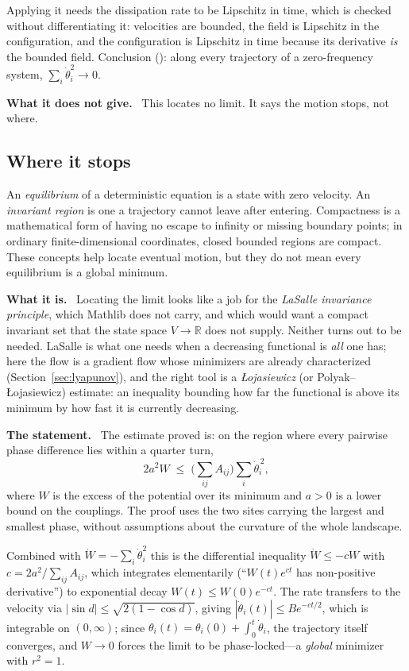 \documentclass[11pt]{article}
\newcommand{\what}{\par\smallskip\noindent\textbf{What it is.}\ }
\newcommand{\statement}{\par\smallskip\noindent\textbf{The statement.}\ }
\newcommand{\scope}{\par\smallskip\noindent\textbf{What it does not give.}\ }
\newcommand{\id}[1]{{\small\ttfamily\seqsplit{#1}}}
\newcommand{\R}{\mathbb{R}}
\begin{document}
Applying it needs the dissipation rate to be Lipschitz in time, which is
checked without differentiating it: velocities are bounded, the field is
Lipschitz in the configuration, and the configuration is Lipschitz in time
because its derivative \emph{is} the bounded field. Conclusion
(\id{velocity\_sq\_tendsto\_zero}): along every trajectory of a zero-frequency
system, $\sum_i\dot\theta_i^2\to0$.

\scope
This locates no limit. It says the motion stops, not where.

\subsection{Where it stops}

An \emph{equilibrium} of a deterministic equation is a state with zero
velocity. An \emph{invariant region} is one a trajectory cannot leave after
entering. Compactness is a mathematical form of having no escape to infinity
or missing boundary points; in ordinary finite-dimensional coordinates,
closed bounded regions are compact. These concepts help locate eventual motion,
but they do not mean every equilibrium is a global minimum.

\what
Locating the limit looks like a job for the \emph{LaSalle invariance
principle}, which Mathlib does not carry, and which would want a compact
invariant set that the state space $V\to\R$ does not supply. Neither turns out
to be needed. LaSalle is what one needs when a decreasing functional is
\emph{all} one has; here the flow is a gradient flow whose minimizers are
already characterized (Section~\ref{sec:lyapunov}), and the right tool is a
\emph{\L{}ojasiewicz} (or Polyak--\L{}ojasiewicz) estimate: an inequality
bounding how far the functional is above its minimum by how fast it is
currently decreasing.

\statement
The estimate proved is: on the region where every pairwise phase difference
lies within a quarter turn,
\[
 2a^2 W \;\le\; \Big(\sum_{ij}A_{ij}\Big)\sum_i\dot\theta_i^{\,2},
\]
where $W$ is the excess of the potential over its minimum and $a>0$ is a lower
bound on the couplings. The proof uses the two sites carrying the largest and
smallest phase, without assumptions about the curvature of the whole landscape.

Combined with $\dot W=-\sum_i\dot\theta_i^2$ this is the differential
inequality $\dot W\le -cW$ with $c=2a^2/\sum_{ij}A_{ij}$, which integrates
elementarily (``$W(t)e^{ct}$ has non-positive derivative'') to exponential
decay $W(t)\le W(0)e^{-ct}$. The rate transfers to the velocity via
$|\sin d|\le\sqrt{2(1-\cos d)}$, giving $|\dot\theta_i(t)|\le Be^{-ct/2}$,
which is integrable on $(0,\infty)$; since
$\theta_i(t)=\theta_i(0)+\int_0^t\dot\theta_i$, the trajectory itself
converges, and $W\to0$ forces the limit to be phase-locked---a \emph{global}
minimizer with $r^2=1$.
\end{document}
